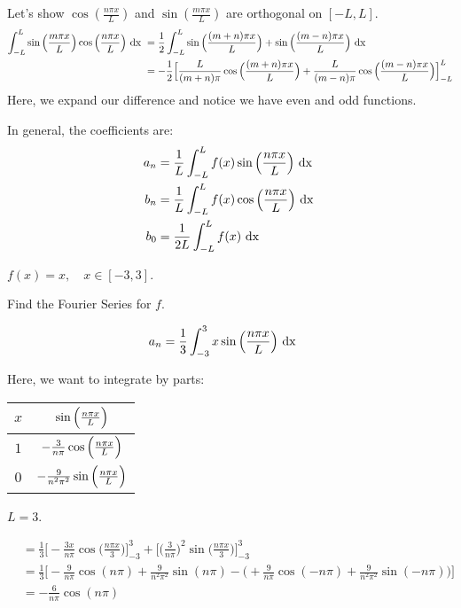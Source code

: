   Let's show $\cos(\frac{n \pi x}{L})$ and $\sin(\frac{m \pi x}{L})$ are orthogonal on $[-L, L]$.
  \begin{align}
    \int^L_{-L} \sin\Big(\frac{m \pi x}{L}\Big) \cos \Big( \frac{n \pi x}{L} \Big) \text{ dx } & = \frac{1}{2} \int^L_{-L} \sin\Big( \frac{(m + n) \pi x}{L} \Big) + \sin\Big( \frac{(m - n) \pi x}{L} \Big) \text{ dx }\\
    & = - \frac{1}{2} \Big[ \frac{L}{(m + n) \pi} \cos\Big(\frac{(m + n) \pi x}{L} \Big) + \frac{L}{(m - n)\pi} \cos\Big( \frac{(m - n) \pi x}{L} \Big) \Big]^L_{-L}
  \end{align}
  Here, we expand our difference and notice we have even and odd functions.

  In general, the coefficients are:
  \begin{align}
    a_n & = \frac{1}{L} \int^L_{-L} f(x) \sin \Big( \frac{n \pi x}{L} \Big) \text{ dx }\\
    b_n & = \frac{1}{L} \int^L_{-L} f(x) \cos \Big( \frac{n \pi x}{L} \Big) \text{ dx }\\
    b_0 & = \frac{1}{2L} \int^L_{-L} f(x) \text{ dx }
  \end{align}

  \Ex $f(x) = x, \quad x \in [-3, 3]$.

  Find the Fourier Series for $f$.

  \begin{align}
    a_n & = \frac{1}{3} \int^3_{-3} x \sin \Big( \frac{n \pi x}{L} \Big) \text{ dx }
  \end{align}

  Here, we want to integrate by parts:
  \begin{center}
    \begin{tabular}{c|c}
      $x$ & $\sin \Big( \frac{n \pi x}{L} \Big)$\\
      \hline
      $1$ & $- \frac{3}{n \pi} \cos \Big( \frac{n \pi x}{L} \Big)$\\
      \hline
      $0$ & $- \frac{9}{n^2 \pi^2} \sin \Big( \frac{n \pi x}{L} \Big)$
    \end{tabular}
    \note $L = 3$.
  \end{center}

  \begin{align}
    & = \frac{1}{3} \Big[ -\frac{3 x}{n \pi} \cos\Big( \frac{n \pi x}{3} \Big) \Big]^3_{-3} + \Big[ \Big( \frac{3}{n \pi} \Big)^2 \sin\Big( \frac{n \pi x}{3} \Big)\Big]^3_{-3}\\
    & = \frac{1}{3} \Bigg[ -\frac{9}{n \pi} \cos(n \pi) + \frac{9}{n^2 \pi^2}
    \sin(n \pi) -
    \Big( +\frac{9}{n \pi} \cos(-n \pi) + \frac{9}{n^2 \pi^2} \sin(-n \pi) \Big)\Bigg]\\
    & = -\frac{6}{n \pi} \cos(n \pi)
  \end{align}

